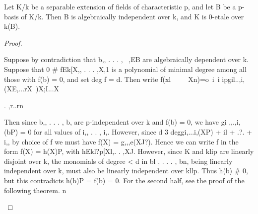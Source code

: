 \begin{theorem}[Theorem 26.8]\label{mcrt-auto-theorem-26-8}\uses{}
\begin{mathematicalrecord}
Let K/k be a separable extension of fields of characteristic
p, and let B be a p-basis of K/k. Then B is algebraically independent over
k, and K is 0-etale over k(B).
\end{mathematicalrecord}
\end{theorem}
\begin{proof}
\begin{mathematicalrecord}
Suppose by contradiction       that b,, . . . , ~,EB are algebraically
dependent over k. Suppose that 0 # fEk[X,,       . . . ,X,1 is a polynomial of
minimal degree among all those with f(b) = 0, and set deg f = d. Then write
         f(xl~~~~~Xn)=o~i~i                    ipgil..,i,(XE,...rX~)X;I...X~

                                 .    ,r..rn


Then since b,, . . . , b, are p-independent over k and f(b) = 0, we have
gi ,,.,i,(bP) = 0 for all values of i,, . . , i,. However, since
         d 3 deggi,...i,(XP)         + il + .?. + i,,
by choice of f we must have f(X) = g,,,e(XJ?). Hence we can write f in
the form f(X) = h(X)P, with hEkl?p[Xl,.      . ,XJ. However, since K and
klip are linearly disjoint over k, the monomials of degree < d in bl , . . . , bn,
being linearly independent over k, must also be linearly independent over
kllp. Thus h(b) # 0, but this contradicts h(b)P = f(b) = 0. For the second
half, see the proof of the following theorem.      n
\end{mathematicalrecord}
\end{proof}


